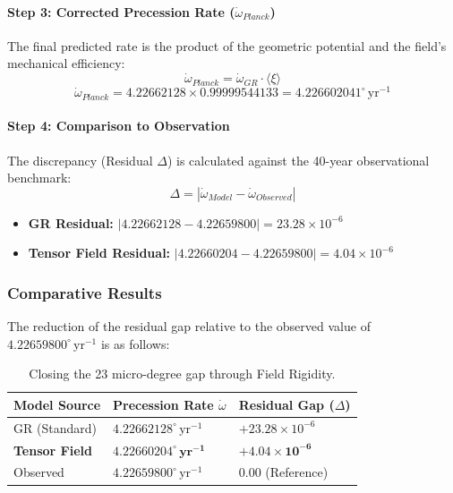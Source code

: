 \documentclass{article}
\begin{document}
\paragraph{Step 3: Corrected Precession Rate ($\dot{\omega}_{Planck}$)}
The final predicted rate is the product of the geometric potential and the field's mechanical efficiency:
\begin{equation}
\dot{\omega}_{Planck} = \dot{\omega}_{GR} \cdot \langle \xi \rangle
\end{equation}
\begin{equation}
\dot{\omega}_{Planck} = 4.22662128 \times 0.99999544133 = 4.226602041^\circ \, \text{yr}^{-1}
\end{equation}

\paragraph{Step 4: Comparison to Observation}
The discrepancy (Residual $\Delta$) is calculated against the 40-year observational benchmark:
\begin{equation}
\Delta = |\dot{\omega}_{Model} - \dot{\omega}_{Observed}|
\end{equation}
\begin{itemize}
    \item \textbf{GR Residual:} $|4.22662128 - 4.22659800| = 23.28 \times 10^{-6}$
    \item \textbf{Tensor Field Residual:} $|4.22660204 - 4.22659800| = 4.04 \times 10^{-6}$
\end{itemize}

\subsubsection{Comparative Results}
The reduction of the residual gap relative to the observed value of $4.22659800^\circ \, \text{yr}^{-1}$ is as follows:

\begin{table}[h!]
\centering
\renewcommand{\arraystretch}{1.5}
\begin{tabular}{|l|l|l|}
\hline
\textbf{Model Source} & \textbf{Precession Rate $\dot{\omega}$} & \textbf{Residual Gap ($\Delta$)} \\ \hline
GR (Standard) & $4.22662128^\circ \, \text{yr}^{-1}$ & $+23.28 \times 10^{-6}$ \\ \hline
\textbf{Tensor Field} & $\mathbf{4.22660204^\circ \, \text{yr}^{-1}}$ & $\mathbf{+4.04 \times 10^{-6}}$ \\ \hline
Observed & $4.22659800^\circ \, \text{yr}^{-1}$ & $0.00$ (Reference) \\ \hline
\end{tabular}
\caption{Closing the 23 micro-degree gap through Field Rigidity.}
\label{tab:high_precision_HT}
\end{table}
\end{document}
